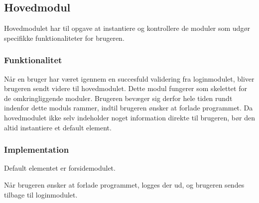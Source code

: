 \subsection{Hovedmodul}
\label{sub:hovedmodul}

Hovedmodulet har til opgave at instantiere og kontrollere de moduler som udgør specifikke funktionaliteter for brugeren.

\subsubsection{Funktionalitet}
\label{ssub:hovedmodul_funktionalitet}

Når en bruger har været igennem en succesfuld validering fra loginmodulet, bliver brugeren sendt videre til hovedmodulet.  Dette modul fungerer som skelettet for de omkringliggende moduler. Brugeren bevæger sig derfor hele tiden rundt indenfor dette moduls rammer, indtil brugeren ønsker at forlade programmet. Da hovedmodulet ikke selv indeholder noget information direkte til brugeren, bør den altid instantiere et default element.

\subsubsection{Implementation}
\label{ssub:hovedmodul_implementation}

Default elementet er forsidemodulet.

Når brugeren ønsker at forlade programmet, logges der ud, og brugeren sendes tilbage til loginmodulet.


